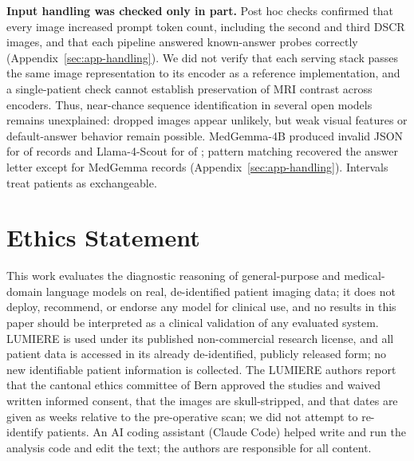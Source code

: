 \documentclass[11pt]{article}
\begin{document}
\textbf{Input handling was checked only in part.} Post hoc checks confirmed that every image increased prompt token count, including the second and third DSCR images, and that each pipeline answered known-answer probes correctly (Appendix~\ref{sec:app-handling}). We did not verify that each serving stack passes the same image representation to its encoder as a reference implementation, and a single-patient check cannot establish preservation of MRI contrast across encoders. Thus, near-chance sequence identification in several open models remains unexplained: dropped images appear unlikely, but weak visual features or default-answer behavior remain possible. MedGemma-4B produced invalid JSON for \vfourParseInvalidMedGemma{} of \vfourParseNMedGemma{} records and Llama-4-Scout for \vfourParseInvalidScout{} of \vfourParseNScout{}; pattern matching recovered the answer letter except for \vfourParseNoLetterMedGemma{} MedGemma records (Appendix~\ref{sec:app-handling}). Intervals treat patients as exchangeable.

\section*{Ethics Statement}

This work evaluates the diagnostic reasoning of general-purpose and medical-domain language models on real, de-identified patient imaging data; it does not deploy, recommend, or endorse any model for clinical use, and no results in this paper should be interpreted as a clinical validation of any evaluated system. LUMIERE is used under its published non-commercial research license, and all patient data is accessed in its already de-identified, publicly released form; no new identifiable patient information is collected. The LUMIERE authors report that the cantonal ethics committee of Bern approved the studies and waived written informed consent, that the images are skull-stripped, and that dates are given as weeks relative to the pre-operative scan; we did not attempt to re-identify patients. An AI coding assistant (Claude Code) helped write and run the analysis code and edit the text; the authors are responsible for all content.

%



\appendix
\end{document}
